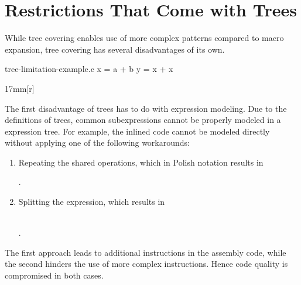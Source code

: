 \section{Restrictions That Come with Trees}

While \gls{tree covering} enables use of more complex \glspl{pattern} compared
to \gls{macro expansion}, \gls{tree covering} has several disadvantages of its
own.

\begin{filecontents*}{tree-limitation-example.c}
x = a + b
y = x + x
\end{filecontents*}
%
\begin{inParFigure}{17mm}[r]
  \centering

  \vspace{1.25\baselineskip}

  \begin{lstpage}{\linewidth}%
  \end{lstpage}%
\end{inParFigure}%
%
The first disadvantage of \glspl{tree} has to do with expression modeling.
%
Due to the definitions of \glspl{tree}, common subexpressions cannot be properly
modeled in a \gls{expression tree}.
%
For example, the inlined code cannot be modeled directly without applying one of
the following workarounds:
%
\begin{enumerate}
  \item Repeating the shared operations, which in \gls{Polish notation} results
    in
    \begin{center}
      .
    \end{center}
  \item Splitting the expression, which results in
    \begin{center}
      \\
      .
    \end{center}
\end{enumerate}


\noindent
The first approach leads to additional \glspl{instruction} in the \gls{assembly
  code}, while the second hinders the use of more complex \glspl{instruction}.
%
Hence code quality is compromised in both cases.

